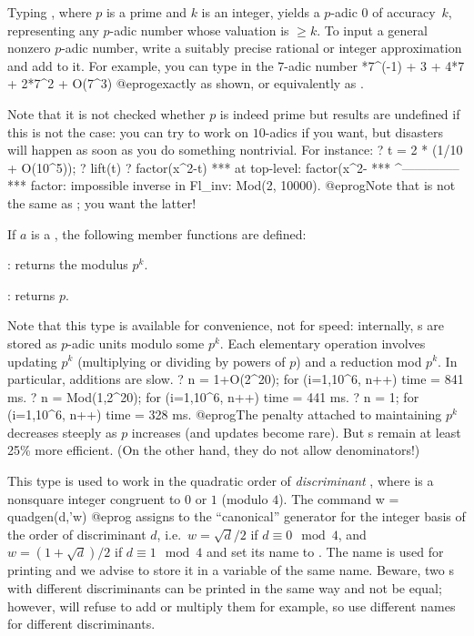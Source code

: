 %
\label{se:padic}
Typing , where $p$ is a prime and $k$ is an integer,
yields a $p$-adic $0$ of accuracy~$k$, representing any $p$-adic number whose
valuation is $\geq k$. To input a general nonzero $p$-adic number, write
a suitably precise rational or integer approximation and add  to it. For example, you can type in the $7$-adic number
*7^(-1) + 3 + 4*7 + 2*7^2 + O(7^3)
@eprog\noindent exactly as shown, or equivalently as .

Note that it is not checked whether $p$ is indeed prime but results are
undefined if this is not the case: you can try to work on $10$-adics if
you want, but disasters will happen as soon as you do something nontrivial.
For instance:
\bprog
? t = 2 * (1/10 + O(10^5));
? lift(t)
? factor(x^2-t)
  ***   at top-level: factor(x^2-%
  ***                 ^--------------
  *** factor: impossible inverse in Fl_inv: Mod(2, 10000).
@eprog\noindent Note that  is not the same as ;
you want the latter!

If $a$ is a , the following member functions are defined:

: returns the modulus $p^k$.

: returns $p$.

Note that this type is available for convenience, not for speed:
internally, s are stored as $p$-adic units modulo some $p^k$.
Each elementary operation involves updating $p^k$ (multiplying or
dividing by powers of $p$) and a reduction mod $p^k$. In particular,
additions are slow.
\bprog
    ? n = 1+O(2^20);   for (i=1,10^6, n++)
    time = 841 ms.
    ? n = Mod(1,2^20); for (i=1,10^6, n++)
    time = 441 ms.
    ? n = 1;           for (i=1,10^6, n++)
    time = 328 ms.
@eprog\noindent The penalty attached to maintaining $p^k$ decreases
steeply as $p$ increases (and updates become rare). But s
remain at least 25\% more efficient. (On the other hand, they do not allow
denominators!)

%
This type is used to work in the quadratic order of \emph{discriminant}
, where  is a nonsquare integer congruent to $0$ or $1$
(modulo $4$). The command
\bprog
    w = quadgen(d,'w)
@eprog\noindent
assigns to  the ``canonical'' generator for the integer basis
of the order of discriminant $d$, i.e.~$w=\sqrt{d}/2$ if $d\equiv 0 \mod 4$,
and $w=(1+\sqrt{d})/2$ if $d\equiv 1 \mod 4$ and set its name to .
The name  is used for printing and we advise to store it in a variable
of the same name.
Beware, two s with different discriminants can be printed in the same
way and not be equal; however,  will refuse to add or multiply them for
example, so use different names for different discriminants.

